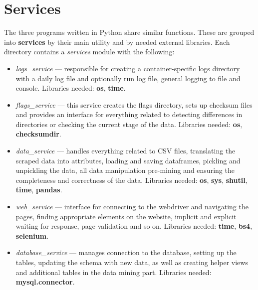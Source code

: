 \section{Services}
The three programs written in Python share similar functions. These are grouped into \textbf{services} by their main utility and by needed external libraries. Each directory contains a \textit{services} module with the following:
\begin{itemize}
\setlength\itemsep{0.3em}
\item \textit{logs\_service} --- responsible for creating a container-specific logs directory with a daily log file and optionally run log file, general logging to file and console. Libraries needed: \textbf{os}, \textbf{time}.
\item \textit{flags\_service} --- this service creates the flags directory, sets up checksum files and provides an interface for everything related to detecting differences in directories or checking the current stage of the data. Libraries needed: \textbf{os}, \textbf{checksumdir}.
\item \textit{data\_service} --- handles everything related to CSV files, translating the scraped data into attributes, loading and saving dataframes, pickling and unpickling the data, all data manipulation pre-mining and ensuring the completeness and correctness of the data. Libraries needed: \textbf{os}, \textbf{sys}, \textbf{shutil}, \textbf{time}, \textbf{pandas}.
\item \textit{web\_service} --- interface for connecting to the webdriver and navigating the pages, finding appropriate elements on the website, implicit and explicit waiting for response, page validation and so on. Libraries needed: \textbf{time}, \textbf{bs4}, \textbf{selenium}.
\item \textit{database\_service} --- manages connection to the database, setting up the tables, updating the schema with new data, as well as creating helper views and additional tables in the data mining part. Libraries needed: \textbf{mysql.connector}.
\end{itemize}

